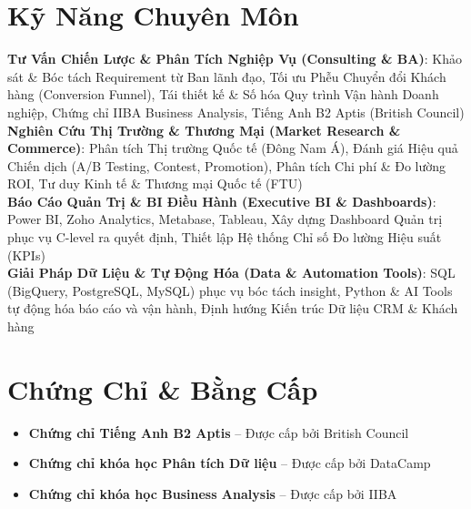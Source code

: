 \documentclass[letterpaper,11pt]{article}
\newcommand{\resumeItem}[1]{
  \item\small{
    {#1 \vspace{1pt}}
  }
}
\newcommand{\resumeItemListStart}{\begin{itemize}[leftmargin=0.15in, itemsep=2.5pt, topsep=2pt, parsep=1.5pt]}
\newcommand{\resumeItemListEnd}{\end{itemize}\vspace{2pt}}
\begin{document}
\section*{Kỹ Năng Chuyên Môn}
 \begin{itemize}[leftmargin=0.15in, label={}]
    \small{\item{
     \textbf{Tư Vấn Chiến Lược \& Phân Tích Nghiệp Vụ (Consulting \& BA)}: {Khảo sát \& Bóc tách Requirement từ Ban lãnh đạo, Tối ưu Phễu Chuyển đổi Khách hàng (Conversion Funnel), Tái thiết kế \& Số hóa Quy trình Vận hành Doanh nghiệp, Chứng chỉ IIBA Business Analysis, Tiếng Anh B2 Aptis (British Council)} \\ \vspace{2pt}
     \textbf{Nghiên Cứu Thị Trường \& Thương Mại (Market Research \& Commerce)}: {Phân tích Thị trường Quốc tế (Đông Nam Á), Đánh giá Hiệu quả Chiến dịch (A/B Testing, Contest, Promotion), Phân tích Chi phí \& Đo lường ROI, Tư duy Kinh tế \& Thương mại Quốc tế (FTU)} \\ \vspace{2pt}
     \textbf{Báo Cáo Quản Trị \& BI Điều Hành (Executive BI \& Dashboards)}: {Power BI, Zoho Analytics, Metabase, Tableau, Xây dựng Dashboard Quản trị phục vụ C-level ra quyết định, Thiết lập Hệ thống Chỉ số Đo lường Hiệu suất (KPIs)} \\ \vspace{2pt}
     \textbf{Giải Pháp Dữ Liệu \& Tự Động Hóa (Data \& Automation Tools)}: {SQL (BigQuery, PostgreSQL, MySQL) phục vụ bóc tách insight, Python \& AI Tools tự động hóa báo cáo và vận hành, Định hướng Kiến trúc Dữ liệu CRM \& Khách hàng}
    }}
 \end{itemize}

\section*{Chứng Chỉ \& Bằng Cấp}
        \resumeItemListStart
      \resumeItem{\textbf{Chứng chỉ Tiếng Anh B2 Aptis} -- Được cấp bởi British Council}
      \resumeItem{\textbf{Chứng chỉ khóa học Phân tích Dữ liệu} -- Được cấp bởi DataCamp}
      \resumeItem{\textbf{Chứng chỉ khóa học Business Analysis} -- Được cấp bởi IIBA}
      \resumeItemListEnd

\end{document}
